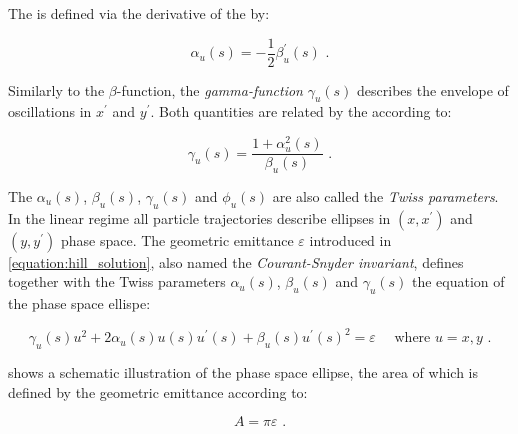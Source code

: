 The \alphafunction is defined via the derivative of the \betafunction by:

\begin{equation}
    \alpha_u(s) = - \frac{1}{2} \beta^{\prime}_u(s) \text{ .}
    \label{equation:alpha_function}
\end{equation}

Similarly to the \(\beta\)-function, the \emph{gamma-function} $\gamma_u(s)$ describes the envelope of oscillations in \(x^{\prime}\) and \(y^{\prime}\).
Both quantities are related by the \alphafunction according to:

\begin{equation}
    \gamma_u(s) = \frac{1 + \alpha_u^2(s)}{\beta_u(s)} \text{ .}
    \label{equation:gamma_function}
\end{equation}

The \(\alpha_u (s)\), \(\beta_u (s)\), \(\gamma_u (s)\) and \(\phi_u (s)\) are also called the \emph{Twiss parameters}.
In the linear regime all particle trajectories describe ellipses in \((x, x^{\prime})\) and \((y, y^{\prime})\) phase space.
The geometric emittance \(\varepsilon\) introduced in \cref{equation:hill_solution}, also named the \emph{Courant-Snyder invariant}, defines together with the Twiss parameters \(\alpha_u (s)\), \(\beta_u (s)\) and \(\gamma_u (s)\) the equation of the phase space ellispe:

\begin{equation}
    \gamma_{u}(s) u^{2} + 2 \alpha_{u}(s) u(s) u^{\prime}(s) + \beta_{u}(s) u^{\prime}(s)^{2} = \varepsilon \quad \text { where } u = x, y \text{ .}
    \label{equation:ellipse_equation}
\end{equation}

 shows a schematic illustration of the phase space ellipse, the area of which is defined by the geometric emittance according to:

\begin{equation}
    A = \pi \varepsilon \text{ .}
    \label{equation:phase_space_ellipse_area}
\end{equation}

